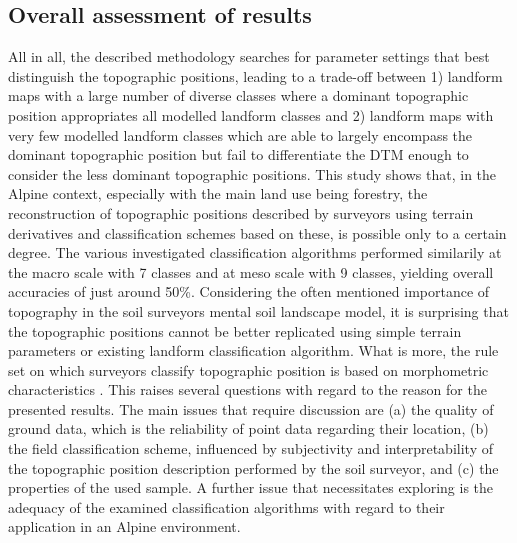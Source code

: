 \documentclass[preprint,12pt,authoryear]{elsarticle}
\begin{document}
\subsection{Overall assessment of results}
All in all, the described methodology searches for parameter settings that best distinguish the topographic positions, leading to a trade-off between 1) landform maps with a large number of diverse classes where a dominant topographic position appropriates all modelled landform classes and 2) landform maps with very few modelled landform classes which are able to largely encompass the dominant topographic position but fail to differentiate the DTM enough to consider the less dominant topographic positions.
This study shows that, in the Alpine context, especially with the main land use being forestry, the reconstruction of topographic positions described by surveyors using terrain derivatives and classification schemes based on these, is possible only to a certain degree. The various investigated classification algorithms performed similarily at the  macro scale with 7 classes and at meso scale with 9 classes, yielding overall accuracies of just around 50\%. Considering the often mentioned importance of topography in the soil surveyors mental soil landscape model, it is surprising that the topographic positions cannot be better replicated using simple terrain parameters or existing landform classification algorithm. What is more, the rule set on which surveyors classify topographic position is based on morphometric characteristics \citep{Englisch1998}. This raises several questions with regard to the reason for the presented results. The main issues that require discussion are (a) the quality of ground data, which is the reliability of point data regarding their location, (b) the field classification scheme, influenced by subjectivity and interpretability of the topographic position description performed by the soil surveyor, and (c) the properties of the used sample. A further issue that necessitates exploring is the adequacy of the examined classification algorithms with regard to their application in an Alpine environment. 
\end{document}
